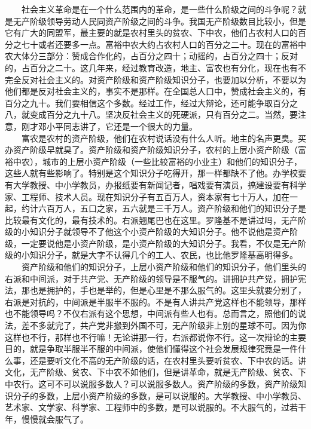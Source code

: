 \documentclass[cn,11pt,chinese]{elegantbook}
\begin{document}
　　社会主义革命是在一个什么范围内的革命，是一些什么阶级之间的斗争呢？就是无产阶级领导劳动人民同资产阶级之间的斗争。我国无产阶级数目比较小，但是它有广大的同盟军，最主要的就是农村里头的贫农、下中农，他们占农村人口的百分之七十或者还要多一点。富裕中农大约占农村人口的百分之二十。现在的富裕中农大体分三部分：赞成合作化的，占百分之四十；动摇的，占百分之四十；反对的，占百分之二十。这几年来，经过教育改造，地主、富农也有分化，现在也有不完全反对社会主义的。对资产阶级和资产阶级知识分子，也要加以分析，不要以为他们都是反对社会主义的，事实不是那样。在全国总人口中，赞成社会主义的，有百分之九十。我们要相信这个多数。经过工作，经过大辩论，还可能争取百分之八，就变成百分之九十八。坚决反社会主义的死硬派，只有百分之二。当然，要注意，刚才邓小平同志讲了，它还是一个很大的力量。\\
　　富农是农村的资产阶级，他们在农村说话没有什么人听。地主的名声更臭。买办资产阶级早就臭了。资产阶级和资产阶级知识分子，农村的上层小资产阶级（富裕中农），城市的上层小资产阶级（一些比较富裕的小业主）和他们的知识分子，这些人就有些影响了。特别是这个知识分子吃得开，那一样都缺不了他。办学校要有大学教授、中小学教员，办报纸要有新闻记者，唱戏要有演员，搞建设要有科学家、工程师、技术人员。现在知识分子有五百万人，资本家有七十万人，加在一起，约计六百万人，五口之家，五六就是三千万人。资产阶级和他们的知识分子是比较最有文化的，最有技术的。右派翘尾巴也在这里。罗隆基不是讲过吗，无产阶级的小知识分子就领导不了他这个小资产阶级的大知识分子。他不说他是资产阶级，一定要说他是小资产阶级，是小资产阶级的大知识分子。我看，不仅是无产阶级的小知识分子，就是大字不认得几个的工人、农民，也比他罗隆基高明得多。\\
　　资产阶级和他们的知识分子，上层小资产阶级和他们的知识分子，他们里头的右派和中间派，对于共产党、无产阶级的领导是不服气的。讲拥护共产党，拥护宪法，那也是拥护的，手也是举的，但是心里是不那么服气的。这里头就要分别了，右派是对抗的，中间派是半服半不服的。不是有人讲共产党这样也不能领导，那样也不能领导吗？不仅右派有这个思想，中间派有些人也有。总而言之，照他们的说法，差不多就完了，共产党非搬到外国不可，无产阶级非上别的星球不可。因为你这样也不行，那样也不行嘛！无论讲那一行，右派都说你不行。这一次辩论的主要目的，就是争取半服半不服的中间派，使他们懂得这个社会发展规律究竟是一件什么事，还是要听文化不高的无产阶级的话，在农村里头要听贫农、下中农的话。讲文化，无产阶级、贫农、下中农不如他们，但是讲革命，就是无产阶级、贫农、下中农行。这可不可以说服多数人？可以说服多数人。资产阶级的多数，资产阶级知识分子的多数，上层小资产阶级的多数，是可以说服的。大学教授、中小学教员、艺术家、文学家、科学家、工程师中的多数，是可以说服的。不大服气的，过若干年，慢慢就会服气了。\\
\end{document}
